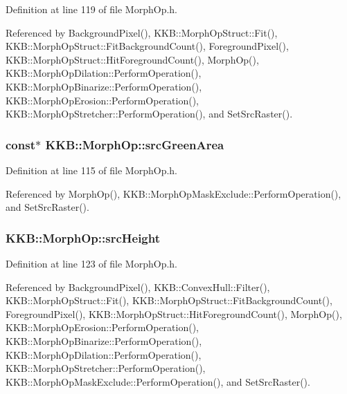 Definition at line 119 of file Morph\+Op.\+h.



Referenced by Background\+Pixel(), K\+K\+B\+::\+Morph\+Op\+Struct\+::\+Fit(), K\+K\+B\+::\+Morph\+Op\+Struct\+::\+Fit\+Background\+Count(), Foreground\+Pixel(), K\+K\+B\+::\+Morph\+Op\+Struct\+::\+Hit\+Foreground\+Count(), Morph\+Op(), K\+K\+B\+::\+Morph\+Op\+Dilation\+::\+Perform\+Operation(), K\+K\+B\+::\+Morph\+Op\+Binarize\+::\+Perform\+Operation(), K\+K\+B\+::\+Morph\+Op\+Erosion\+::\+Perform\+Operation(), K\+K\+B\+::\+Morph\+Op\+Stretcher\+::\+Perform\+Operation(), and Set\+Src\+Raster().

\subsubsection[{\texorpdfstring{src\+Green\+Area}{srcGreenArea}}]{ const$\ast$ K\+K\+B\+::\+Morph\+Op\+::src\+Green\+Area\hspace{0.3cm}{\ttfamily [protected]}}\hypertarget{class_k_k_b_1_1_morph_op_a1a3372b8645c297f21c5805707aef8a0}{}\label{class_k_k_b_1_1_morph_op_a1a3372b8645c297f21c5805707aef8a0}


Definition at line 115 of file Morph\+Op.\+h.



Referenced by Morph\+Op(), K\+K\+B\+::\+Morph\+Op\+Mask\+Exclude\+::\+Perform\+Operation(), and Set\+Src\+Raster().

\subsubsection[{\texorpdfstring{src\+Height}{srcHeight}}]{ K\+K\+B\+::\+Morph\+Op\+::src\+Height\hspace{0.3cm}{\ttfamily [protected]}}\hypertarget{class_k_k_b_1_1_morph_op_a54b2ce1b398a80803b4dbe8aef956b51}{}\label{class_k_k_b_1_1_morph_op_a54b2ce1b398a80803b4dbe8aef956b51}


Definition at line 123 of file Morph\+Op.\+h.



Referenced by Background\+Pixel(), K\+K\+B\+::\+Convex\+Hull\+::\+Filter(), K\+K\+B\+::\+Morph\+Op\+Struct\+::\+Fit(), K\+K\+B\+::\+Morph\+Op\+Struct\+::\+Fit\+Background\+Count(), Foreground\+Pixel(), K\+K\+B\+::\+Morph\+Op\+Struct\+::\+Hit\+Foreground\+Count(), Morph\+Op(), K\+K\+B\+::\+Morph\+Op\+Erosion\+::\+Perform\+Operation(), K\+K\+B\+::\+Morph\+Op\+Binarize\+::\+Perform\+Operation(), K\+K\+B\+::\+Morph\+Op\+Dilation\+::\+Perform\+Operation(), K\+K\+B\+::\+Morph\+Op\+Stretcher\+::\+Perform\+Operation(), K\+K\+B\+::\+Morph\+Op\+Mask\+Exclude\+::\+Perform\+Operation(), and Set\+Src\+Raster().

